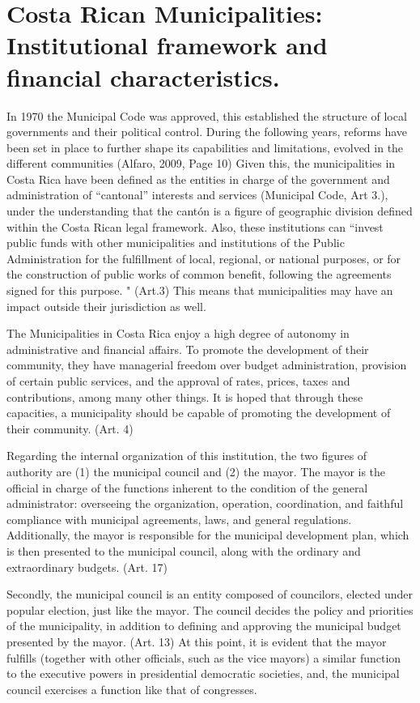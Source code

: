 \section{Costa Rican Municipalities: Institutional framework and financial characteristics. }

In 1970 the Municipal Code was approved, this established the structure of local governments and their political control. During the following years, reforms have been set in place to further shape its capabilities and limitations, evolved in the different communities (Alfaro, 2009, Page 10) Given this, the municipalities in Costa Rica have been defined as the entities in charge of the government and administration of “cantonal” interests and services (Municipal Code, Art 3.), under the understanding that the cantón is a figure of geographic division defined within the Costa Rican legal framework. Also, these institutions can “invest public funds with other municipalities and institutions of the Public Administration for the fulfillment of local, regional, or national purposes, or for the construction of public works of common benefit, following the agreements signed for this purpose. " (Art.3) This means that municipalities may have an impact outside their jurisdiction as well. 

The Municipalities in Costa Rica enjoy a high degree of autonomy in administrative and financial affairs. To promote the development of their community, they have managerial freedom over budget administration, provision of certain public services, and the approval of rates, prices, taxes and contributions, among many other things. It is hoped that through these capacities, a municipality should be capable of promoting the development of their community. (Art. 4) 

Regarding the internal organization of this institution, the two figures of authority are (1) the municipal council and (2) the mayor. The mayor is the official in charge of the functions inherent to the condition of the general administrator: overseeing the organization, operation, coordination, and faithful compliance with municipal agreements, laws, and general regulations. Additionally, the mayor is responsible for the municipal development plan, which is then presented to the municipal council, along with the ordinary and extraordinary budgets. (Art. 17)

Secondly, the municipal council is an entity composed of councilors, elected under popular election, just like the mayor. The council decides the policy and priorities of the municipality, in addition to defining and approving the municipal budget presented by the mayor. (Art. 13) At this point, it is evident that the mayor fulfills (together with other officials, such as the vice mayors) a similar function to the executive powers in presidential democratic societies, and, the municipal council exercises a function like that of congresses.

